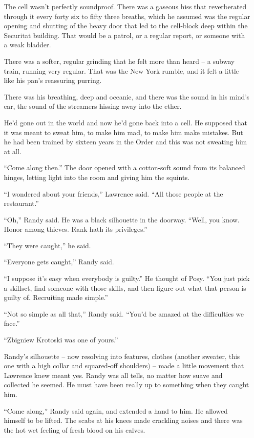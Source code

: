 The cell wasn't perfectly soundproof. There was a gaseous hiss that 
reverberated through it every forty six to fifty three breaths, which 
he assumed was the regular opening and shutting of the heavy door that 
led to the cell-block deep within the Securitat building. That would be 
a patrol, or a regular report, or someone with a weak bladder.

There was a softer, regular grinding that he felt more than heard -- a 
subway train, running very regular. That was the New York rumble, and 
it felt a little like his pan's reassuring purring.

There was his breathing, deep and oceanic, and there was the sound in 
his mind's ear, the sound of the streamers hissing away into the ether.

He'd gone out in the world and now he'd gone back into a cell. He 
supposed that it was meant to sweat him, to make him mad, to make him 
make mistakes. But he had been trained by sixteen years in the Order 
and this was not sweating him at all.

“Come along then.” The door opened with a cotton-soft sound from 
its balanced hinges, letting light into the room and giving him the 
squints.

“I wondered about your friends,” Lawrence said. “All those people 
at the restaurant.”

“Oh,” Randy said. He was a black silhouette in the doorway. 
“Well, you know. Honor among thieves. Rank hath its privileges.”

“They were caught,” he said.

“Everyone gets caught,” Randy said.

“I suppose it's easy when everybody is guilty.” He thought of Posy. 
“You just pick a skillset, find someone with those skills, and then 
figure out what that person is guilty of. Recruiting made simple.”

“Not so simple as all that,” Randy said. “You'd be amazed at the 
difficulties we face.”

“Zbigniew Krotoski was one of yours.”

Randy's silhouette -- now resolving into features, clothes (another 
sweater, this one with a high collar and squared-off shoulders) -- made 
a little movement that Lawrence knew meant yes. Randy was all tells, no 
matter how suave and collected he seemed. He must have been really up 
to something when they caught him.

“Come along,” Randy said again, and extended a hand to him. He 
allowed himself to be lifted. The scabs at his knees made crackling 
noises and there was the hot wet feeling of fresh blood on his calves.

